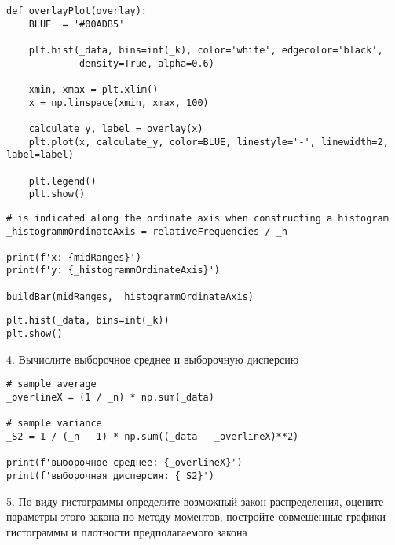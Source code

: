 \documentclass[a4paper, 14pt]{extarticle}
\begin{document}
\begin{lstlisting}
def overlayPlot(overlay):
    BLUE  = '#00ADB5'

    plt.hist(_data, bins=int(_k), color='white', edgecolor='black', 
             density=True, alpha=0.6)

    xmin, xmax = plt.xlim()
    x = np.linspace(xmin, xmax, 100)
    
    calculate_y, label = overlay(x)
    plt.plot(x, calculate_y, color=BLUE, linestyle='-', linewidth=2, label=label)

    plt.legend()
    plt.show()
\end{lstlisting}

\begin{lstlisting}
# is indicated along the ordinate axis when constructing a histogram
_histogrammOrdinateAxis = relativeFrequencies / _h

print(f'x: {midRanges}')
print(f'y: {_histogrammOrdinateAxis}')

buildBar(midRanges, _histogrammOrdinateAxis)
\end{lstlisting}

\begin{lstlisting}
plt.hist(_data, bins=int(_k))
plt.show()
\end{lstlisting}

\begin{center}
    4. Вычислите выборочное среднее и выборочную дисперсию
\end{center}

\begin{lstlisting}
# sample average
_overlineX = (1 / _n) * np.sum(_data) 

# sample variance
_S2 = 1 / (_n - 1) * np.sum((_data - _overlineX)**2)

print(f'выборочное среднее: {_overlineX}')
print(f'выборочная дисперсия: {_S2}')
\end{lstlisting}

\begin{center}
    5. По виду гистограммы определите возможный закон распределения, 
    оцените параметры этого закона по методу моментов, постройте совмещенные 
    графики гистограммы и плотности предполагаемого закона
\end{center}
\end{document}

